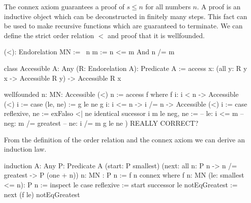 The connex axiom guarantees a proof of $s \le n$ for all numbers $n$. A proof is
an inductive object which can be deconstructed in finitely many steps. This fact
can be used to make recursive functions which are guaranteed to terminate. We
can define the strict order relation $<$ and proof that it is wellfounded.

\begin{alba}
    (<): Endorelation MN :=
        \ n m := n <= m And n /= m

    class Accessible {A: Any} (R: Endorelation A): Predicate A :=
        access {x}:
            (all {y}: R y x -> Accessible R y)
            -> Accessible R x

    wellfounded {n: MN}: Accessible (<) n :=
        access f where
            f {i}: i < n -> Accessible (<) i :=
                case
                    (le, ne) :=
                        g le ne
            g {i}: i <= n -> i /= n -> Accessible (<) i :=
                case
                    reflexive, ne :=
                        exFalso <| ne identical
                    sucessor {i m} le neg, ne :=
                        -- le: i <= m
                        -- neg: m /= greatest
                        -- ne: i /= m
                        g le ne
            )
    REALLY CORRECT?
\end{alba}

\begin{comment}
    Really correct?

    Suspicion: The proof does not use the fact 'm /= greatest'. I.e. it
    would go through, even if we had defined '<=' without the condition. In
    that case all numbers would satisfy 'n <= m' and 'n < m' would be
    equivalent to 'n /= m'.
\end{comment}


From the definition of the order relation and the connex axiom we can derive an
induction law.

\begin{alba}
    induction
        {A: Any} {P: Predicate A}
        (start: P smallest)
        (next: all {n}: P n -> n /= greatest -> P (one + n))
        {n: MN}
        : P n
    :=
        f {n} connex
        where
            f {n: MN} (le: smallest <= n): P n
            :=
                inspect le case
                    reflexive :=
                        start
                    successor le notEqGreatest :=
                        next (f le) notEqGreatest
\end{alba}







